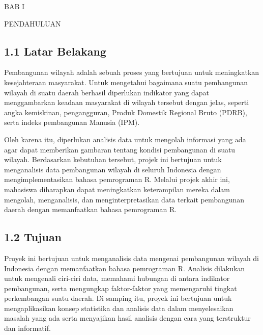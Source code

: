 \documentclass[
  12pt,
]{article}
\begin{document}
\begin{center}
  {
    \bfseries

    \vfill

    \Large

    BAB I

    PENDAHULUAN
  }
\end{center}

\subsection{\texorpdfstring{\normalsize 1.1 \hspace {0,5cm} Latar
Belakang}{1.1  Latar Belakang}}\label{latar-belakang}

Pembangunan wilayah adalah sebuah proses yang bertujuan untuk
meningkatkan kesejahteraan masyarakat. Untuk mengetahui bagaimana suatu
pembangunan wilayah di suatu daerah berhasil diperlukan indikator yang
dapat menggambarkan keadaan masyarakat di wilayah tersebut dengan jelas,
seperti angka kemiskinan, pengangguran, Produk Domestik Regional Bruto
(PDRB), serta indeks pembangunan Manusia (IPM).

Oleh karena itu, diperlukan analisis data untuk mengolah informasi yang
ada agar dapat memberikan gambaran tentang kondisi pembangunan di suatu
wilayah. Berdasarkan kebutuhan tersebut, projek ini bertujuan untuk
menganalisis data pembangunan wilayah di seluruh Indonesia dengan
mengimplementasikan bahasa pemrograman R. Melalui projek akhir ini,
mahasiswa diharapkan dapat meningkatkan keterampilan mereka dalam
mengolah, menganalisis, dan menginterpretasikan data terkait pembangunan
daerah dengan memanfaatkan bahasa pemrograman R.

\subsection{\texorpdfstring{\normalsize 1.2 \hspace {0,5cm}
Tujuan}{1.2  Tujuan}}\label{tujuan}

Proyek ini bertujuan untuk menganalisis data mengenai pembangunan
wilayah di Indonesia dengan memanfaatkan bahasa pemrograman R. Analisis
dilakukan untuk mengenali ciri-ciri data, memahami hubungan di antara
indikator pembangunan, serta mengungkap faktor-faktor yang memengaruhi
tingkat perkembangan suatu daerah. Di samping itu, proyek ini bertujuan
untuk mengaplikasikan konsep statistika dan analisis data dalam
menyelesaikan masalah yang ada serta menyajikan hasil analisis dengan
cara yang terstruktur dan informatif.

\setcounter{page}{1}
\end{document}
